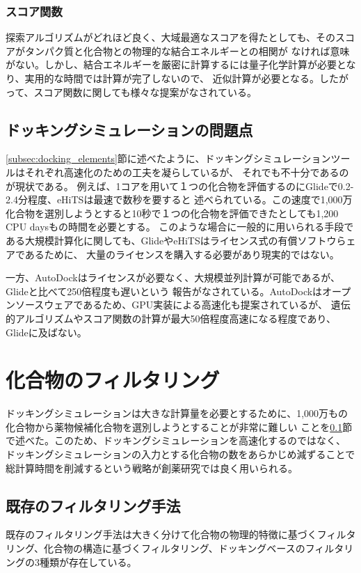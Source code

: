 \subsubsection{スコア関数}
探索アルゴリズムがどれほど良く、大域最適なスコアを得たとしても、そのスコアがタンパク質と化合物との物理的な結合エネルギーとの相関が
なければ意味がない。しかし、結合エネルギーを厳密に計算するには量子化学計算が必要となり、実用的な時間では計算が完了しないので、
近似計算が必要となる。したがって、スコア関数に関しても様々な提案がなされている。

\subsection{ドッキングシミュレーションの問題点}\label{subsec:docking_problem}
\ref{subsec:docking_elements}節に述べたように、ドッキングシミュレーションツールはそれぞれ高速化のための工夫を凝らしているが、
それでも不十分であるのが現状である。
例えば、1コアを用いて１つの化合物を評価するのにGlideで0.2-2.4分程度\cite{Friesner2004}、eHiTSは最速で数秒\cite{Zsoldos2007}を要すると
述べられている。この速度で1,000万化合物を選別しようとすると10秒で１つの化合物を評価できたとしても1,200 CPU daysもの時間を必要とする。
このような場合に一般的に用いられる手段である大規模計算化に関しても、GlideやeHiTSはライセンス式の有償ソフトウらェアであるために、
大量のライセンスを購入する必要があり現実的ではない。

一方、AutoDockはライセンスが必要なく、大規模並列計算が可能であるが、Glideと比べて250倍程度も遅いという
報告がなされている\cite{Tuccinardi2010}。AutoDockはオープンソースウェアであるため、GPU実装による高速化も提案されているが、
遺伝的アルゴリズムやスコア関数の計算が最大50倍程度高速になる程度であり\cite{Kannan2010}、Glideに及ばない。

\section{化合物のフィルタリング}
ドッキングシミュレーションは大きな計算量を必要とするために、1,000万もの化合物から薬物候補化合物を選別しようとすることが非常に難しい
ことを\ref{subsec:docking_problem}節で述べた。このため、ドッキングシミュレーションを高速化するのではなく、
ドッキングシミュレーションの入力とする化合物の数をあらかじめ減ずることで総計算時間を削減するという戦略が創薬研究では良く用いられる。

\subsection{既存のフィルタリング手法}\label{subsec:existing_filtering}
既存のフィルタリング手法は大きく分けて化合物の物理的特徴に基づくフィルタリング、化合物の構造に基づくフィルタリング、ドッキングベースのフィルタリングの3種類が存在している。
